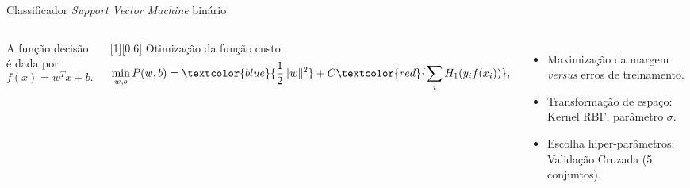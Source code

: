 \begin{frame}{Classificador \textit{Support Vector Machine} binário}
	\begin{columns}[T]
	A função decisão é dada por
	\begin{equation*}
	f(x)=w^T x+ b.
	\end{equation*}

	[0.6]
	Otimização da função custo
	\begin{equation*}
		\label{eq:svm-cost}
		\min_{w,b} P(w,b) = \textcolor{blue}{\frac{1}{2}\|w\|^2} + C\textcolor{red}{\sum_i H_1(y_i f(x_i))},
	\end{equation*}

	\begin{itemize}
		\item Maximização da margem \emph{versus} erros de treinamento.
		\item Transformação de espaço: Kernel RBF, parâmetro $\sigma$.
		\item Escolha hiper-parâmetros: Validação Cruzada (5 conjuntos).
	\end{itemize}
	\end{columns}
\end{frame}
